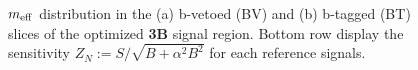 \clearpage
\begin{figure}[h]
  \centering
    \caption{ 
     $m_{\mathrm{eff}}$ distribution in the (a) b-vetoed (BV) and (b) b-tagged (BT) slices of the optimized \textbf{3B} signal region. Bottom row display the sensitivity $Z_N := S/\sqrt{B+\alpha^2 B^2}$ for each reference signals.
    \label{fig::SRdefinition::SRmeffInc3B}}
\end{figure}
